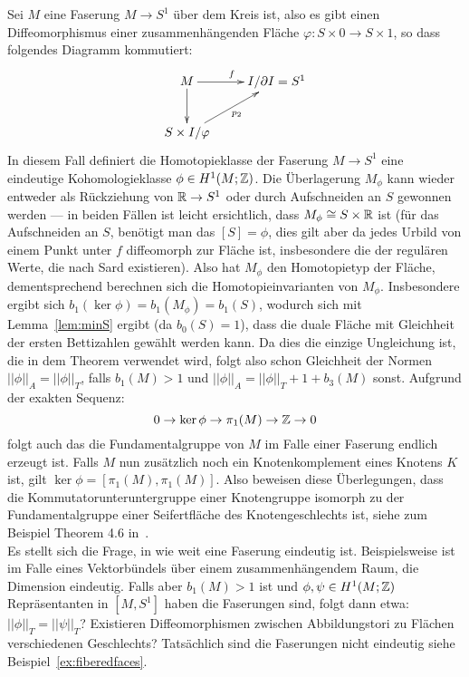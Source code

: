    
    \begin{bsp}
    	Sei $M$ eine Faserung $M\to S^1$ über dem Kreis ist, also es gibt einen Diffeomorphismus einer zusammenhängenden Fläche $\varphi: S \times 0 \to S\times 1$, so dass folgendes Diagramm kommutiert:
    	\[
    		\begin{xy}
    			\xymatrix{M \ar[r]^f \ar[d] &I/\partial I = S^1 \\
    					S\times I /\varphi \ar[ru]_{p_2}}
    		\end{xy}
    	\]
    	In diesem Fall definiert die Homotopieklasse der Faserung $M \to S^1$ eine eindeutige Kohomologieklasse $\phi\in H^1(M;\mathbb{Z})$. Die Überlagerung $M_\phi$ kann wieder entweder als Rückziehung von $\mathbb{R} \to S^1$ oder durch Aufschneiden an $S$ gewonnen werden --- in beiden Fällen ist leicht ersichtlich, dass $M_\phi \cong S \times \mathbb{R}$ ist (für das Aufschneiden an $S$, benötigt man das $[S]=\phi$, dies gilt aber da jedes Urbild von einem Punkt unter $f$ diffeomorph zur Fläche ist, insbesondere die der regulären Werte, die nach Sard existieren). Also hat $M_\phi$ den Homotopietyp der Fläche, dementsprechend berechnen sich die Homotopieinvarianten von $M_\phi$.  Insbesondere ergibt sich $b_1(\ker\phi) =b_1(M_\phi)= b_1(S)$, wodurch sich mit Lemma~\ref{lem:minS} ergibt (da $b_0(S)=1$), dass die duale Fläche mit Gleichheit der ersten Bettizahlen gewählt werden kann. Da dies die einzige Ungleichung ist, die in dem Theorem verwendet wird, folgt also schon Gleichheit der Normen $||\phi||_A = ||\phi||_T$, falls $b_1(M)>1$ und $||\phi||_A = ||\phi||_T+1+b_3(M)$ sonst. Aufgrund der exakten Sequenz:
    	\[
    		0 \to \ker\phi \to \pi_1(M) \to \mathbb{Z} \to 0
    	\]
    	folgt auch das die Fundamentalgruppe von $M$ im Falle einer Faserung endlich erzeugt ist. Falls $M$ nun zusätzlich noch ein Knotenkomplement eines Knotens $K$ ist, gilt $\ker\phi = [\pi_1(M),\pi_1(M)]$. Also beweisen diese Überlegungen, dass die Kommutatorunteruntergruppe einer Knotengruppe isomorph zu der Fundamentalgruppe einer Seifertfläche des Knotengeschlechts ist, siehe zum Beispiel Theorem 4.6 in~\cite{Burde2003}.\\
        Es stellt sich die Frage, in wie weit eine Faserung eindeutig ist. Beispielsweise ist im Falle eines Vektorbündels über einem zusammenhängendem Raum, die Dimension eindeutig. Falls aber $b_1(M)>1$ ist und $\phi,\psi \in H^1(M;\mathbb{Z})$ Repräsentanten in $[M,S^1]$ haben die Faserungen sind, folgt dann etwa: $||\phi||_T=||\psi||_T$? Existieren Diffeomorphismen zwischen Abbildungstori zu Flächen verschiedenen Geschlechts? Tatsächlich sind die Faserungen nicht eindeutig siehe Beispiel~\ref{ex:fiberedfaces}.\\

\end{bsp}
